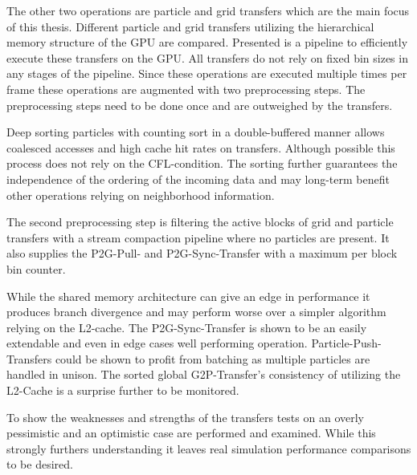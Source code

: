 \documentclass[m,times]{cgMA}
\begin{document}
The other two operations are particle and grid transfers which are the main focus of this thesis. Different particle and grid transfers utilizing the hierarchical memory structure of the GPU are compared. Presented is a pipeline to efficiently execute these transfers on the GPU. All transfers do not rely on fixed bin sizes in any stages of the pipeline. Since these operations are executed multiple times per frame these operations are augmented with two preprocessing steps. The preprocessing steps need to be done once and are outweighed by the transfers.

Deep sorting particles with counting sort in a double-buffered manner allows coalesced accesses and high cache hit rates on transfers. Although possible this process does not rely on the CFL-condition. The sorting further guarantees the independence of the ordering of the incoming data and may long-term benefit other operations relying on neighborhood information.

The second preprocessing step is filtering the active blocks of grid and particle transfers with a stream compaction pipeline where no particles are present. It also supplies the P2G-Pull- and P2G-Sync-Transfer with a maximum per block bin counter.

While the shared memory architecture can give an edge in performance it produces branch divergence and may perform worse over a simpler algorithm relying on the L2-cache. The P2G-Sync-Transfer is shown to be an easily extendable and even in edge cases well performing operation. Particle-Push-Transfers could be shown to profit from batching as multiple particles are handled in unison. The sorted global G2P-Transfer's consistency of utilizing the L2-Cache is a surprise further to be monitored.

To show the weaknesses and strengths of the transfers tests on an overly pessimistic and an optimistic case are performed and examined. While this strongly furthers understanding it leaves real simulation performance comparisons to be desired.
\end{document}
